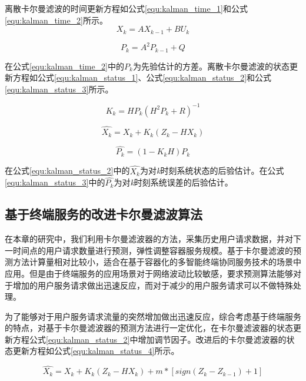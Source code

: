 离散卡尔曼滤波的时间更新方程如公式\ref{equ:kalman_time_1}和公式\ref{equ:kalman_time_2}所示。
\begin{equation}\label{equ:kalman_time_1}
    X_k=AX_{k-1}+BU_k
\end{equation}

\begin{equation}\label{equ:kalman_time_2}
    P_k=A^2P_{k-1}+Q
\end{equation}

在公式\ref{equ:kalman_time_2}中的$P_k$为先验估计的方差。离散卡尔曼滤波的状态更新方程如公式\ref{equ:kalman_status_1}、公式\ref{equ:kalman_status_2}和公式\ref{equ:kalman_status_3}所示。

\begin{equation}\label{equ:kalman_status_1}
    K_k=HP_k(H^2P_k+R)^{-1}
\end{equation}

\begin{equation}\label{equ:kalman_status_2}
    \widehat{X_k}=X_k+K_{k}(Z_k-HX_k)
\end{equation}

\begin{equation}\label{equ:kalman_status_3}
    \widehat{P_k}=(1-K_kH)P_k
\end{equation}

在公式\ref{equ:kalman_status_2}中的$\widehat{X_k}$为对\emph{k}时刻系统状态的后验估计。在公式\ref{equ:kalman_status_3}中的$\widehat{P_k}$为对\emph{k}时刻系统误差的后验估计。

\subsection{基于终端服务的改进卡尔曼滤波算法}

在本章的研究中，我们利用卡尔曼滤波器的方法，采集历史用户请求数据，并对下一时间点的用户请求数量进行预测，弹性调整容器服务规模。基于卡尔曼滤波的预测方法计算量相对比较小，适合在基于容器化的多智能终端协同服务技术的场景中应用。但是由于终端服务的应用场景对于网络波动比较敏感，要求预测算法能够对于增加的用户服务请求做出迅速反应，而对于减少的用户服务请求可以不做特殊处理。

为了能够对于用户服务请求流量的突然增加做出迅速反应，综合考虑基于终端服务的特点，对基于卡尔曼滤波器的预测方法进行一定优化，在卡尔曼滤波器的状态更新方程公式\ref{equ:kalman_status_2}中增加调节因子。改进后的卡尔曼滤波器的状态更新方程如公式\ref{equ:kalman_status_4}所示。

\begin{equation}\label{equ:kalman_status_4}
    \widehat{X_k}=X_k+K_{k}(Z_k-HX_k)+m*[sign(Z_k-Z_{k-1})+1]
\end{equation}

